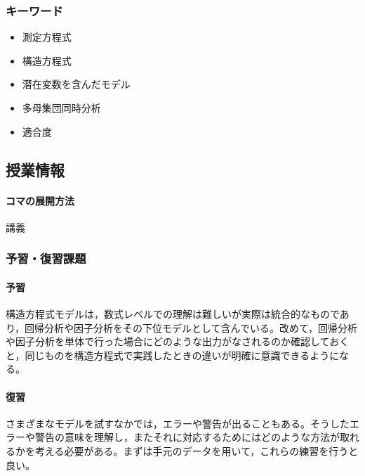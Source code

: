 \subsubsection{キーワード}
\begin{itemize}
	\item 測定方程式
	\item 構造方程式
	\item 潜在変数を含んだモデル
	\item 多母集団同時分析
	\item 適合度
\end{itemize}
\subsection{授業情報}
\paragraph{コマの展開方法}
講義
\subsubsection{予習・復習課題}
\paragraph{予習} 構造方程式モデルは，数式レベルでの理解は難しいが実際は統合的なものであり，回帰分析や因子分析をその下位モデルとして含んでいる。改めて，回帰分析や因子分析を単体で行った場合にどのような出力がなされるのか確認しておくと，同じものを構造方程式で実践したときの違いが明確に意識できるようになる。
\paragraph{復習} さまざまなモデルを試すなかでは，エラーや警告が出ることもある。そうしたエラーや警告の意味を理解し，またそれに対応するためにはどのような方法が取れるかを考える必要がある。まずは手元のデータを用いて，これらの練習を行うと良い。